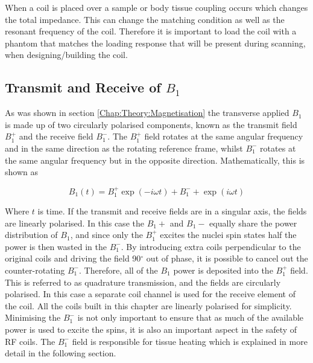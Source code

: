 When a coil is placed over a sample or body tissue coupling occurs which changes the total impedance. This can change the matching condition as well as the resonant frequency of the coil. Therefore it is important to load the coil with a phantom that matches the loading response that will be present during scanning, when designing/building the coil.

\subsection{Transmit and Receive of $B_1$}


As was shown in section \ref{Chap:Theory:Magnetisation} the transverse applied $B_1$ is made up of two circularly polarised components, known as the transmit field $B_1^+$ and the receive field $B_1^-$. The $B_1^+$ field rotates at the same angular frequency and in the same direction as the rotating reference frame, whilst $B_1^-$ rotates at the same angular frequency but in the opposite direction. Mathematically, this is shown as 

\begin{equation}
    B_1(t) = B_1^+\exp(-i\omega t) +B_1^-+\exp(i\omega t)
\end{equation}

Where $t$ is time. If the transmit and receive fields are in a singular axis, the fields are linearly polarised. In this case the $B_1+$ and $B_1-$ equally share the power distribution of $B_1$, and since only the $B_1^+$ excites the nuclei spin states half the power is then wasted in the $B_1^-$. By introducing extra coils perpendicular to the original coils and driving the field 90$^\circ$ out of phase, it is possible to cancel out the counter-rotating $B_1^-$. Therefore, all of the $B_1$ power is deposited into the $B_1^+$ field. This is referred to as quadrature transmission, and the fields are circularly polarised. In this case a separate coil channel is used for the receive element of the coil. All the coils built in this chapter are linearly polarised for simplicity. Minimising the $B_1^-$ is not only important to ensure that as much of the available power is used to excite the spins, it is also an important aspect in the safety of \ac{RF} coils. The $B_1^-$ field is responsible for tissue heating which is explained in more detail in the following section. 


